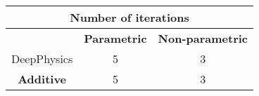 \documentclass[varwidth=10.5cm,border=2mm]{standalone}
\begin{document}
    \begin{center}
        \begin{table}[htbp]
            \centering
            \begin{tabular}{ccc}
                \toprule
                \multicolumn{3}{c}{\textbf{Number of iterations}} \\
                \midrule
                & \textbf{Parametric} & \textbf{Non-parametric} \\
                \midrule
                DeepPhysics & 5 & 3 \\
                \cmidrule(lr){1-3}
                \textbf{Additive} & 5 & 3 \\
                \bottomrule
            \end{tabular}
        \end{table}
    \end{center}
\end{document}
